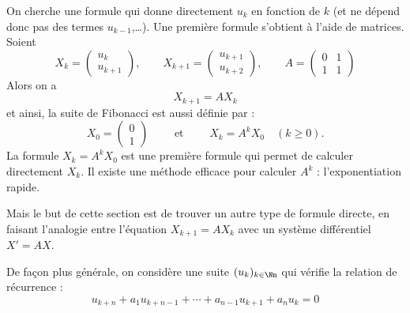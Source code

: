 \documentclass[12pt, class=report,crop=false]{standalone}
\begin{document}
On cherche une formule qui donne directement $u_k$ en fonction de $k$ (et ne dépend donc pas des termes $u_{k-1}$,\ldots).
Une première formule s'obtient à l'aide de matrices.
Soient
$$X_k =  \begin{pmatrix}u_k \\ u_{k+1}\end{pmatrix}, \qquad X_{k+1} =  \begin{pmatrix}u_{k+1} \\ u_{k+2}\end{pmatrix},
\qquad A = \begin{pmatrix}0&1\\1&1\end{pmatrix}$$
Alors on a 
$$X_{k+1} = A X_k$$
et ainsi, la suite de Fibonacci est aussi définie par :
$$X_0 = \begin{pmatrix}0\\1\end{pmatrix} \qquad \text{ et } \qquad X_k = A^k X_0 \quad (k\ge0).$$
La formule $X_k = A^k X_0$ est une première formule qui permet de calculer directement $X_k$. Il existe une méthode efficace pour calculer $A^k$ : l'exponentiation rapide. 

Mais le but de cette section est de trouver un autre type de formule directe, en faisant l'analogie entre
l'équation $X_{k+1} = A X_k$ avec un système différentiel $X'=AX$.

De façon plus générale, on considère une suite $(u_k)_{k \in \Nn}$ qui vérifie la relation de récurrence :
\begin{equation}
u_{k+n} + a_1 u_{k+n-1}+ \cdots+ a_{n-1}u_{k+1} +a_n u_k=0
\label{eq:eqrec}\tag{$E$}
\end{equation}
\end{document}
